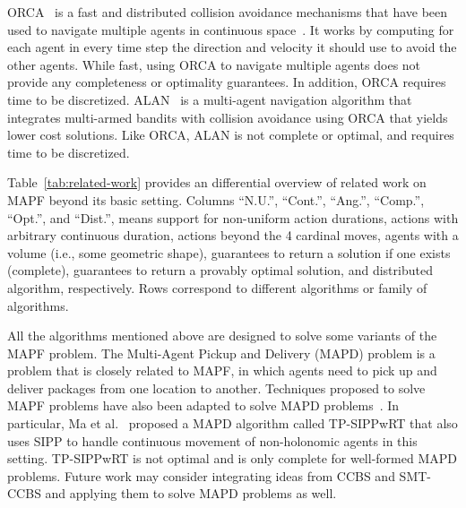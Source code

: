 \documentclass[review]{elsarticle}
\newcommand\konstantin[1]{\nb{\textbf{Konstantin:}}{red}{#1}}
\newcommand\roni[1]{\nb{\textbf{Roni:}}{green}{#1}}
\newcommand\pavel[1]{\nb{\textbf{Pavel:}}{blue}{#1}}
\newcommand{\ccbs}{\ac{CCBS}\xspace}
\newcommand{\sipp}{\ac{SIPP}\xspace}
\newcommand{\smtccbs}{SMT-CCBS\xspace}
\newcommand{\mapf}{\ac{MAPF}\xspace}
\newcommand{\shortcite}{\cite}
\begin{document}
ORCA~\cite{van2005prioritized,snape2011hybrid} is a fast and distributed 
collision avoidance mechanisms that have been used to navigate multiple agents in continuous space~\cite{snape2010smooth}. 
It works by computing for each agent in every time step the direction and velocity it should use to avoid the other agents. While fast, using ORCA to navigate multiple agents does not provide any completeness or optimality guarantees. In addition, ORCA requires time to be discretized. 
ALAN~\cite{godoy2018alan} is a multi-agent navigation algorithm that integrates multi-armed bandits with collision avoidance using ORCA that yields lower cost solutions. 
Like ORCA, ALAN is not complete or optimal, and requires time to be discretized. 


Table~\ref{tab:related-work} provides an differential overview of related work on \ac{MAPF} beyond its basic setting. 
Columns ``N.U.'',  ``Cont.'', ``Ang.'', ``Comp.'', ``Opt.'', and ``Dist.'', means support for non-uniform action durations, 
actions with arbitrary continuous duration, 
actions beyond the 4 cardinal moves, 
agents with a volume (i.e., some geometric shape), 
guarantees to return a solution if one exists (complete),
guarantees to return a provably optimal solution, 
and distributed algorithm, respectively. Rows correspond to  different algorithms or family of algorithms. %


All the algorithms mentioned above are designed to solve some variants of the \mapf problem. 
The Multi-Agent Pickup and Delivery (MAPD) problem is a problem that is closely related to \mapf, in which agents need to pick up and deliver packages from one location to another. Techniques proposed to solve \mapf problems have also been adapted to solve MAPD problems~\cite{ma2017lifelong,LiuAAMAS19,ma2019lifelong}. 
In particular, Ma et al.~\shortcite{ma2019lifelong} proposed a MAPD algorithm called TP-SIPPwRT that also uses \sipp to handle continuous movement of non-holonomic agents in this setting. TP-SIPPwRT is not optimal and is only complete for well-formed MAPD problems. Future work may consider integrating ideas from \ccbs and \smtccbs and applying them to solve MAPD problems as well. 
\end{document}
